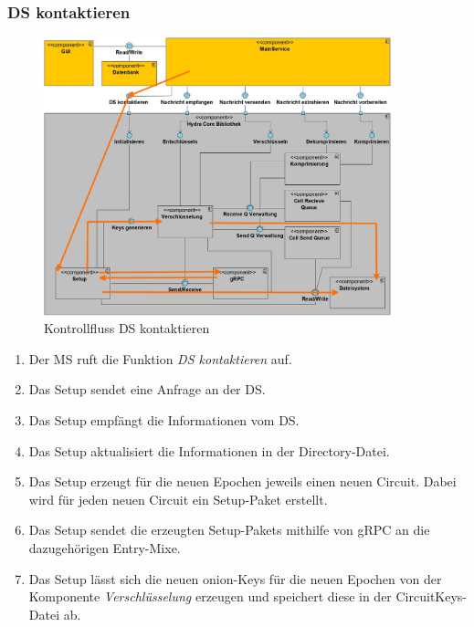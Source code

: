 \newpage
\subsubsection{\ac{DS} kontaktieren}
 
 \begin{figure}[h]
  \centering
     \includegraphics[width=0.9\textwidth]{diagramme/Glob_Kontrollfluss_3.jpg}
  \caption{Kontrollfluss \ac{DS} kontaktieren}
  \label{fig:Bild7}
\end{figure}

\begin{enumerate}
\item Der \ac{MS} ruft die Funktion \textit{\ac{DS} kontaktieren} auf.
\item Das Setup sendet eine Anfrage an der \ac{DS}.
\item Das Setup empfängt die Informationen vom \ac{DS}.
\item Das Setup aktualisiert die Informationen in der Directory-Datei.
\item Das Setup erzeugt für die neuen Epochen jeweils einen neuen Circuit. Dabei wird für jeden neuen Circuit ein Setup-Paket erstellt.
\item Das Setup sendet die erzeugten Setup-Pakets mithilfe von \ac{gRPC} an die dazugehörigen Entry-Mixe.
\item Das Setup lässt sich die neuen onion-Keys für die neuen Epochen von der Komponente \textit{Verschlüsselung} erzeugen und speichert diese in der CircuitKeys-Datei ab.
\end{enumerate}

